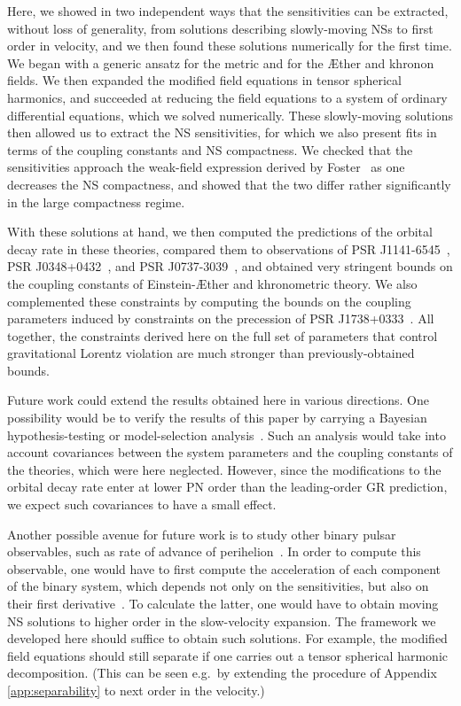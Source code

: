 \documentclass[prd,aps,twocolumn,nofootinbib,showpacs,superscriptaddress]{revtex4-1}
\begin{document}
Here, we showed in two independent ways that the sensitivities can be extracted, without loss
of generality, from solutions describing slowly-moving NSs to first order in velocity, and we then found these solutions numerically for the first time.
We began with a generic ansatz
for the metric and for the \AE ther and khronon fields. We then expanded
the modified field equations in tensor spherical harmonics,
and succeeded at reducing the field equations to a system of ordinary differential equations, which
we solved numerically.
These slowly-moving solutions then allowed us to extract the NS sensitivities,
for which we also present fits in terms of the coupling constants and NS compactness. 
We checked that the sensitivities approach the weak-field expression derived by Foster~\cite{Foster:2007gr} as one decreases the NS compactness, and showed that the two differ rather significantly in the large compactness regime.

With these solutions at hand, we then computed the predictions of the
orbital decay rate in these theories, compared them to
observations of PSR J1141-6545~\cite{bhat}, PSR J0348+0432~\cite{2.01NS}, 
and PSR J0737-3039~\cite{kramer-double-pulsar}, and obtained very
stringent bounds on the coupling constants of Einstein-\AE ther and khronometric theory. We also
complemented these constraints by computing the bounds on the coupling parameters
induced by constraints on the precession of  PSR J1738+0333~\cite{freire}.
All together, the constraints derived here on the full set of parameters that control gravitational Lorentz violation are much stronger than previously-obtained bounds.

Future work could extend the results obtained here in various
directions. One possibility would be to verify the results of this
paper by carrying a Bayesian hypothesis-testing or model-selection
analysis~\cite{Cornish:2007if,vigeland-vallisneri}. 
Such an analysis would take into account covariances between the system 
parameters and the coupling constants of the theories, which were here neglected. 
However, since the modifications to the orbital decay
rate enter at lower PN order than the leading-order GR prediction, we expect such covariances to have a small effect.

Another possible avenue for future work is to study other binary
pulsar observables, such as rate of advance of perihelion~\cite{stairs}.
In order to compute this observable, one would have to first compute the
acceleration of each component of the binary system, which depends not
only on the sensitivities, but also on their first derivative~\cite{Foster:2007gr}. To calculate the latter, one would have to obtain
moving NS solutions to higher order in the slow-velocity expansion. The
framework we developed here should suffice to obtain such
solutions. For example, the modified field equations should still
separate if one carries out a tensor spherical harmonic decomposition.
(This can be seen e.g.~by extending the procedure of Appendix \ref{app:separability} to next order in the velocity.)
\end{document}
